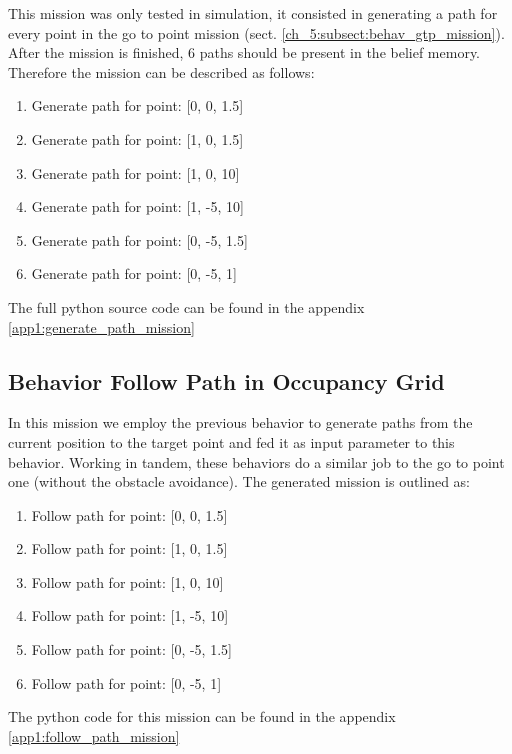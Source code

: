     This mission was only tested in simulation, it consisted in generating a path for every point in the go to point mission (sect. \ref{ch_5:subsect:behav_gtp_mission}). After the mission is finished, $6$ paths should be present in the belief memory. Therefore the mission can be described as follows:
    
    \begin{enumerate}
      \item Generate path for point: [0, 0, 1.5]
      \item Generate path for point: [1, 0, 1.5]
      \item Generate path for point: [1, 0, 10]
      \item Generate path for point: [1, -5, 10]
      \item Generate path for point: [0, -5, 1.5]
      \item Generate path for point: [0, -5, 1]
    \end{enumerate}

    The full python source code can be found in the appendix \ref{app1:generate_path_mission}

  \subsection{Behavior Follow Path in Occupancy Grid} \label{ch_5:subsect:behav_fpath_mission}

  In this mission we employ the previous behavior to generate paths from the current position to the target point and fed it as input parameter to this behavior. Working in tandem, these behaviors do a similar job to the go to point one (without the obstacle avoidance). The generated mission is outlined as:

    \begin{enumerate}
      \item Follow path for point: [0, 0, 1.5]
      \item Follow path for point: [1, 0, 1.5]
      \item Follow path for point: [1, 0, 10]
      \item Follow path for point: [1, -5, 10]
      \item Follow path for point: [0, -5, 1.5]
      \item Follow path for point: [0, -5, 1]
    \end{enumerate}

    The python code for this mission can be found in the appendix \ref{app1:follow_path_mission}

